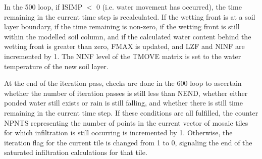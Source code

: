 In the 500 loop, if I\+S\+I\+M\+P $<$ 0 (i.\+e. water movement has occurred), the time remaining in the current time step is recalculated. If the wetting front is at a soil layer boundary, if the time remaining is non-\/zero, if the wetting front is still within the modelled soil column, and if the calculated water content behind the wetting front is greater than zero, F\+M\+A\+X is updated, and L\+Z\+F and N\+I\+N\+F are incremented by 1. The N\+I\+N\+F level of the T\+M\+O\+V\+E matrix is set to the water temperature of the new soil layer.

At the end of the iteration pass, checks are done in the 600 loop to ascertain whether the number of iteration passes is still less than N\+E\+N\+D, whether either ponded water still exists or rain is still falling, and whether there is still time remaining in the current time step. If these conditions are all fulfilled, the counter N\+P\+N\+T\+S representing the number of points in the current vector of mosaic tiles for which infiltration is still occurring is incremented by 1. Otherwise, the iteration flag for the current tile is changed from 1 to 0, signaling the end of the saturated infiltration calculations for that tile.